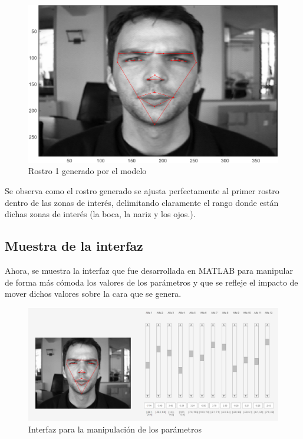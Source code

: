 \documentclass[11pt, letterpaper]{article}
\begin{document}
\begin{figure}[h!]
	\centering %
	\includegraphics[width=1\textwidth]{IMG/G3.png} %
	\caption{Rostro 1 generado por el modelo}
	\label{fig:f4}
\end{figure}

Se observa como el rostro generado se ajusta perfectamente al primer rostro dentro de las zonas de interés, delimitando claramente el rango donde están dichas zonas de interés (la boca, la nariz y los ojos.).

\newpage

\subsection{Muestra de la interfaz}

Ahora, se muestra la interfaz que fue desarrollada en MATLAB para manipular de forma más cómoda los valores de los parámetros y que se refleje el impacto de mover dichos valores sobre la cara que se genera.

\begin{figure}[h!]
	\centering %
	\includegraphics[width=1\textwidth]{IMG/G4.png} %
	\caption{Interfaz para la manipulación de los parámetros}
	\label{fig:f5}
\end{figure}
\end{document}
